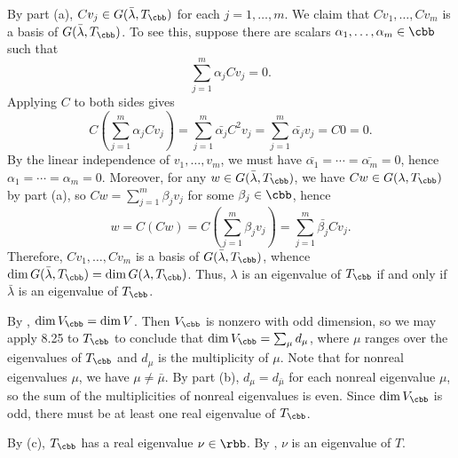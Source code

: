 \begin{sol}
\begin{subexercises}
        By part (a), $C v_j \in G(\bar\lambda, T_{\cbb})$ for each $j = 1, \ldots, m$.
        We claim that $C v_1, \ldots, C v_m$ is a basis of $G(\bar\lambda, T_{\cbb})$.
        To see this, suppose there are scalars $\alpha_1, \ldots, \alpha_m \in \cbb$ such that
        \[
            \sum_{j=1}^m \alpha_j C v_j = 0.
        \]
        Applying $C$ to both sides gives
        \[
            C\left(\sum_{j=1}^m \alpha_j C v_j\right) = \sum_{j=1}^m \bar{\alpha_j} C^2 v_j = \sum_{j=1}^m \bar{\alpha_j} v_j = C0 = 0.
        \]
        By the linear independence of $v_1, \ldots, v_m$, we must have $\bar{\alpha_1} = \cdots = \bar{\alpha_m} = 0$, hence $\alpha_1 = \cdots = \alpha_m = 0$.
        Moreover, for any $w \in G(\bar\lambda, T_{\cbb})$, we have $C w \in G(\lambda, T_{\cbb})$ by part (a), so $C w = \sum_{j=1}^m \beta_j v_j$ for some $\beta_j \in \cbb$, hence
        \[
            w = C(C w) = C\left( \sum_{j=1}^m \beta_j v_j \right) = \sum_{j=1}^m \bar{\beta_j} C v_j.
        \]
        Therefore, $C v_1, \ldots, C v_m$ is a basis of $G(\bar\lambda, T_{\cbb})$, whence $\dim G(\bar\lambda, T_{\cbb}) = \dim G(\lambda, T_{\cbb})$.
        Thus, $\lambda$ is an eigenvalue of $T_{\cbb}$ if and only if $\bar\lambda$ is an eigenvalue of $T_{\cbb}$.
        \item By , $\dim V_{\cbb} = \dim V$.
        Then $V_{\cbb}$ is nonzero with odd dimension, so we may apply 8.25 to $T_{\cbb}$ to conclude that $\dim V_{\cbb} = \sum_{\mu} d_\mu$, where $\mu$ ranges over the eigenvalues of $T_{\cbb}$ and $d_\mu$ is the multiplicity of $\mu$.
        Note that for nonreal eigenvalues $\mu$, we have $\mu \neq \bar\mu$.
        By part (b), $d_\mu = d_{\bar\mu}$ for each nonreal eigenvalue $\mu$, so the sum of the multiplicities of nonreal eigenvalues is even.
        Since $\dim V_{\cbb}$ is odd, there must be at least one real eigenvalue of $T_{\cbb}$.
        \item By (c), $T_{\cbb}$ has a real eigenvalue $\nu \in \rbb$.
        By , $\nu$ is an eigenvalue of $T$. \qedhere
    \end{subexercises}
\end{sol}